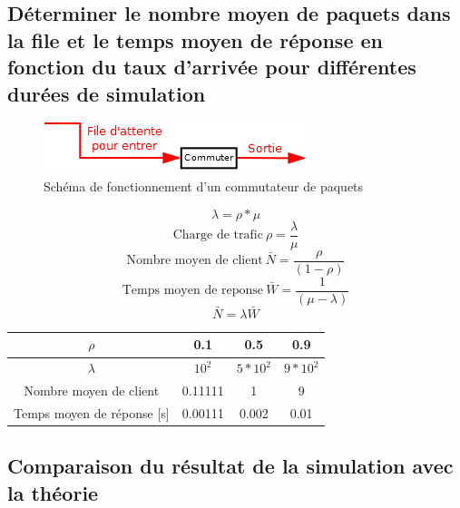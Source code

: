         \subsection{Déterminer le nombre moyen de paquets dans la file et le temps moyen de réponse en fonction du taux d'arrivée pour différentes durées de simulation}
%
            \begin{figure}[h]
                \centering
                \includegraphics[scale=0.7]{RSC/2-1.png}
                \caption{ Schéma de fonctionnement d'un commutateur de paquets }
                \label{ Schema de fonctionnement d'un commutateur de paquets }
            \end{figure}
%
            \[  \lambda = \rho * \mu \]
            \[  \text{Charge de trafic} \ \rho = \frac{\lambda}{\mu} \]
            \[  \text{Nombre moyen de client} \ \bar{N} = \frac{\rho}{(1 - \rho)} \]
            \[  \text{Temps moyen de reponse} \ \bar{W} = \frac{1}{(\mu - \lambda)} \]
            \[  \bar{N} = \lambda \bar{W} \]
%
            \begin{center}
                \begin{tabular}{ | c | c| c | c | }
                    \hline
                        $\rho$ & 0.1 & 0.5 & 0.9 \\
                    \hline
                        $\lambda$ & $10^{2}$ & $5 * 10^{2}$ & $9 * 10^{2}$ \\
                    \hline
                        Nombre moyen de client & 0.11111 & 1 & 9 \\
                    \hline
                        Temps moyen de réponse [s] & 0.00111 & 0.002 & 0.01 \\
                    \hline
                \end{tabular}
            \end{center}
%
%
\clearpage
%
%
        \subsection{Comparaison du résultat de la simulation avec la théorie}
%
